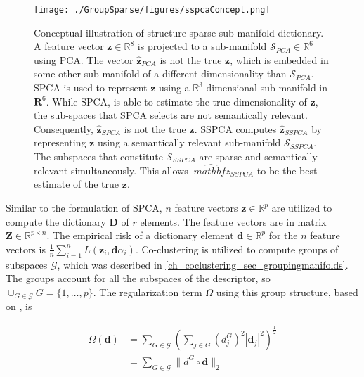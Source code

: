 \begin{figure}[ht]
 \centering
 \texttt{[image: ./GroupSparse/figures/sspcaConcept.png]}
 \caption[Conceptual illustration of structure sparse sub-manifold dictionary]{Conceptual illustration of structure sparse sub-manifold dictionary. A feature vector $\mathbf{z} \in \mathds{R}^{8}$ is projected to a sub-manifold $\mathcal{S}_{PCA} \in \mathds{R}^{6}$ using PCA. The vector $\hat{\mathbf{z}}_{PCA}$ is not the true $\mathbf{z}$, which is embedded in some other sub-manifold of a different dimensionality than $\mathcal{S}_{PCA}$. SPCA is used to represent $\mathbf{z}$ using a $\mathds{R}^{3}$-dimensional sub-manifold in $\mathbf{R}^{6}$. While SPCA, is able to estimate the true dimensionality of $\mathbf{z}$, the sub-spaces that SPCA selects are not semantically relevant. Consequently, $\hat{\mathbf{z}}_{SPCA}$ is not the true $\mathbf{z}$. SSPCA computes $\hat{\mathbf{z}}_{SSPCA}$ by representing $\mathbf{z}$ using a semantically relevant sub-manifold $\mathcal{S}_{SSPCA}$. The subspaces that constitute $\mathcal{S}_{SSPCA}$ are sparse and semantically relevant simultaneously. This allows $\hat{\
mathbf{z}}_{SSPCA}$ to be the best estimate of the true $\mathbf{z}$.}
 \label{fig:sspcaconcept}
\end{figure}

Similar to the formulation of SPCA, $n$ feature vectors $\mathbf{z} \in \mathds{R}^{p}$ are utilized to compute the dictionary $\mathbf{D}$ of $r$ elements. The feature vectors are in matrix $\mathbf{Z} \in \mathds{R}^{p \times n}$. The empirical risk of a dictionary element $\mathbf{d} \in \mathds{R}^{p}$ for the $n$ feature vectors is $\frac{1}{n} \sum_{i=1}^{n} L(\mathbf{z}_{i}, \mathbf{d} \alpha_{i})$. Co-clustering is utilized to compute groups of subspaces $\mathcal{G}$, which was described in \cref{ch_coclustering_sec_groupingmanifolds}. The groups account for all the subspaces of the descriptor, so $\cup_{G \in \mathcal{G}} G = \{1, \ldots, p \}$. The regularization term $\Omega$ using this group structure, based on \citep{Jenatton2010}, is

\begin{equation}
\begin{array}{ll}
 \Omega(\mathbf{d}) &= \sum_{G \in \mathcal{G}} (\sum_{j \in G} (d_{j}^{G})^{2} |\mathbf{d}_{j}|^{2} )^{\frac{1}{2}} \\
                    &= \sum_{G \in \mathcal{G}} \parallel d^{G} \circ \mathbf{d} \parallel_{2}
 \end{array}
\end{equation}

